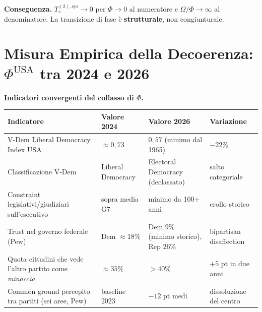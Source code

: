 \Proved{} \textbf{Conseguenza.} \(T_s^{(2),\text{sys}} \to 0\) per
\(\Phi \to 0\) al numeratore e \(\Omega/\Phi \to \infty\) al
denominatore. La transizione di fase è \textbf{strutturale}, non
congiunturale.



\section{\texorpdfstring{Misura Empirica della Decoerenza:
\(\Phi^{\text{USA}}\) tra 2024 e
2026}{Misura Empirica della Decoerenza: \textbackslash Phi\^{}\{\textbackslash text\{USA\}\} tra 2024 e 2026}}\label{misura-empirica-della-decoerenza-phitextusa-tra-2024-e-2026}

\Proved{} \textbf{Indicatori convergenti del collasso di \(\Phi\).}

{\def\LTcaptype{none} %
{\small\begin{longtable}[]{@{}
  >{\raggedright\arraybackslash}p{}
  >{\raggedright\arraybackslash}p{}
  >{\raggedright\arraybackslash}p{}
  >{\raggedright\arraybackslash}p{}@{}}
\toprule\noalign{}
\begin{minipage}[b]{\linewidth}\raggedright
Indicatore
\end{minipage} & \begin{minipage}[b]{\linewidth}\raggedright
Valore 2024
\end{minipage} & \begin{minipage}[b]{\linewidth}\raggedright
Valore 2026
\end{minipage} & \begin{minipage}[b]{\linewidth}\raggedright
Variazione
\end{minipage} \\
\midrule\noalign{}
\endhead
\bottomrule\noalign{}
\endlastfoot
V-Dem Liberal Democracy Index USA & \(\approx 0{,}73\) & \(0{,}57\)
(minimo dal 1965) & \(-22\%\) \\
Classificazione V-Dem & Liberal Democracy & Electoral Democracy
(declassato) & salto categoriale \\
Constraint legislativi/giudiziari sull'esecutivo & sopra media G7 &
minimo da 100+ anni & crollo storico \\
Trust nel governo federale (Pew) & Dem \(\approx 18\%\) & Dem \(9\%\)
(minimo storico), Rep \(26\%\) & bipartisan disaffection \\
Quota cittadini che vede l'altro partito come \emph{minaccia} &
\(\approx 35\%\) & \(> 40\%\) & \(+5\) pt in due anni \\
Common ground percepito tra partiti (sei aree, Pew) & baseline 2023 &
\(-12\) pt medi & dissoluzione del centro \\
\end{longtable}}
}

